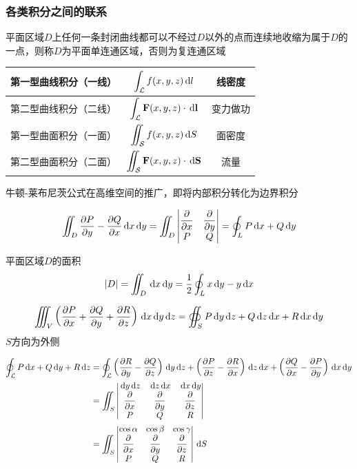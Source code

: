 \subsubsection{各类积分之间的联系}
\begin{definition}[连通区域]
平面区域$D$上任何一条封闭曲线都可以不经过$D$以外的点而连续地收缩为属于$D$的一点，则称$D$为平面单连通区域，否则为复连通区域
\end{definition}
\begin{center}
\begin{tabular}{|c|c|c|}\hline
第一型曲线积分（一线） & $\disp\int_\mL f(x,y,z)\diff l$ & 线密度\\\hline
第二型曲线积分（二线） & $\disp\int_\mL\vF(x,y,z)\cdot\diff\vl$ & 变力做功\\\hline
第一型曲面积分（一面） & $\disp\iint_\mS f(x,y,z)\diff S$ & 面密度\\\hline
第二型曲面积分（二面） & $\disp\iint_\mS\vF(x,y,z)\cdot\diff\vS$ & 流量\\\hline
\end{tabular}
\end{center}
\par 牛顿-莱布尼茨公式在高维空间的推广，即将内部积分转化为边界积分
\begin{theorem}[格林(Green)公式]
\[\iint_D\pd{P}{y}-\pd{Q}{x}\diff x\diff y=\iint_D\vmat{\pd{}{x}&\pd{}{y}\\P&Q}=\oint_LP\diff x+Q\diff y\]
\end{theorem}
平面区域$D$的面积
\[|D|=\iint_D\diff x\diff y=\frac{1}{2}\oint_Lx\diff y-y\diff x\]
\begin{theorem}[高斯(Gauss)公式]
\[\iiint_V\lrp{\pd{P}{x}+\pd{Q}{y}+\pd{R}{z}}\diff x\diff y\diff z=\oiint_SP\diff y\diff z+Q\diff z\diff x+R\diff x\diff y\]
$S$方向为外侧
\end{theorem}
\begin{theorem}
\[\begin{aligned}
\oint_\mL P\diff x+Q\diff y+R\diff z&=\oint_\mL\lrp{\pd{R}{y}-\pd{Q}{z}}\diff y\diff z+\lrp{\pd{P}{z}-\pd{R}{x}}\diff z\diff x+\lrp{\pd{Q}{x}-\pd{P}{y}}\diff x\diff y\\
&=\iint_S\vmat{\diff y\diff z&\diff z\diff x&\diff x\diff y\\\pd{}{x}&\pd{}{y}&\pd{}{z}\\P&Q&R}\\
&=\iint_S\vmat{\cos\alpha&\cos\beta&\cos\gamma\\\pd{}{x}&\pd{}{y}&\pd{}{z}\\P&Q&R}\diff S
\end{aligned}\]
\end{theorem}

